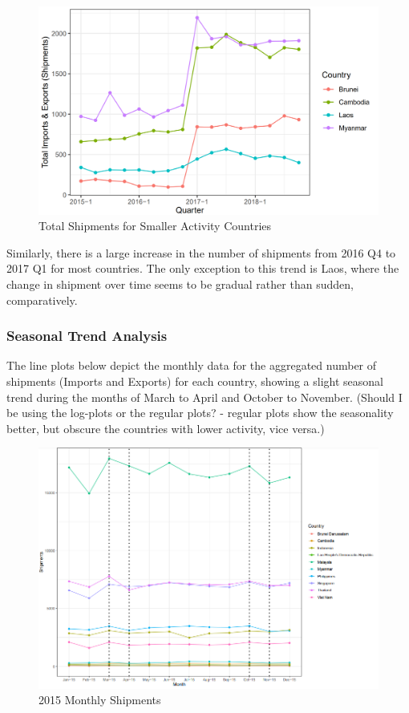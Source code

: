 \documentclass{article}
\begin{document}
\begin{figure}[H]
\centering
\includegraphics[width=1\textwidth]{images/Line Plots/ASEAN/ASEAN_Small_Quarterly_Shipments.png}
\caption{\label{fig2}Total Shipments for Smaller Activity Countries}
\end{figure}

\noindent Similarly, there is a large increase in the number of shipments from 2016 Q4 to 2017 Q1 for most countries. The only exception to this trend is Laos, where the change in shipment over time seems to be gradual rather than sudden, comparatively.

\subsubsection{Seasonal Trend Analysis}
The line plots below depict the monthly data for the aggregated number of shipments (Imports and Exports) for each country, showing a slight seasonal trend during the months of March to April and October to November. (Should I be using the log-plots or the regular plots? - regular plots show the seasonality better, but obscure the countries with lower activity, vice versa.)

\hspace{1}

\begin{figure}[H]
\centering
\includegraphics[width=1\textwidth]{images/Line Plots/Seasonal/2015_seasonal.png}
\caption{2015 Monthly Shipments}
\end{figure}
\end{document}
